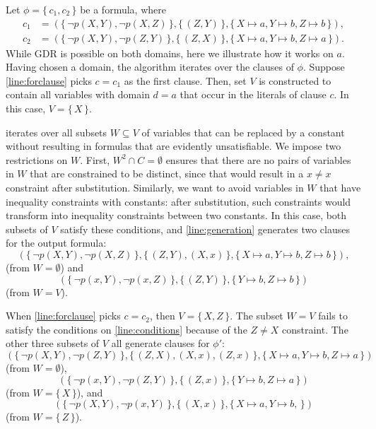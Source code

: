 \begin{example}
  Let $\phi = \{\, c_1, c_2 \,\}$ be a formula, where
  \begin{align*}
    c_1 &= (\{\, \neg p(X, Y), \neg p(X, Z) \,\}, \{\, (Z, Y) \,\}, \{\, X \mapsto a, Y \mapsto b, Z \mapsto b \,\}), \\
    c_2 &= (\{\, \neg p(X, Y), \neg p(Z, Y) \,\}, \{\, (Z, X) \,\}, \{\, X \mapsto a, Y \mapsto b, Z \mapsto a \,\}).
  \end{align*}
  While GDR is possible on both domains, here we illustrate how it works on $a$.
  Having chosen a domain, the algorithm iterates over the clauses of $\phi$.
  Suppose \cref{line:forclause} picks $c = c_1$ as the first clause. Then, set
  $V$ is constructed to contain all variables with domain $d = a$ that occur in
  the literals of clause $c$. In this case, $V = \{\, X \,\}$.

   iterates over all subsets $W \subseteq V$ of variables
  that can be replaced by a constant without resulting in formulas that are
  evidently unsatisfiable. We impose two restrictions on $W$. First,
  $W^2 \cap C = \emptyset$ ensures that there are no pairs of variables in $W$
  that are constrained to be distinct, since that would result in a $x \ne x$
  constraint after substitution. Similarly, we want to avoid variables in $W$
  that have inequality constraints with constants: after substitution, such
  constraints would transform into inequality constraints between two constants.
  In this case, both subsets of $V$ satisfy these conditions, and
  \cref{line:generation} generates two clauses for the output formula:
  \[
    (\{\, \neg p(X, Y), \neg p(X, Z) \,\}, \{\, (Z, Y), (X, x) \,\}, \{\, X \mapsto a, Y \mapsto b, Z \mapsto b \,\}),
  \]
  (from $W = \emptyset$) and
  \[
    (\{\, \neg p(x, Y), \neg p(x, Z) \,\}, \{\, (Z, Y) \,\}, \{\, Y \mapsto b, Z \mapsto b \,\})
  \]
  (from $W = V$).

  When \cref{line:forclause} picks $c = c_2$, then $V = \{\, X, Z \,\}$. The
  subset $W = V$ fails to satisfy the conditions on \cref{line:conditions}
  because of the $Z \ne X$ constraint. The other three subsets of $V$ all
  generate clauses for $\phi'$:
  \[
    (\{\, \neg p(X, Y), \neg p(Z, Y) \,\}, \{\, (Z, X), (X, x), (Z, x) \,\}, \{\, X \mapsto a, Y \mapsto b, Z \mapsto a \,\})
  \]
  (from $W = \emptyset$),
  \[
    (\{\, \neg p(x, Y), \neg p(Z, Y) \,\}, \{\, (Z, x) \,\}, \{\, Y \mapsto b, Z \mapsto a \,\})
  \]
  (from $W = \{\, X \,\}$), and
  \[
    (\{\, \neg p(X, Y), \neg p(x, Y) \,\}, \{\, (X, x) \,\}, \{\, X \mapsto a, Y \mapsto b, \,\})
  \]
  (from $W = \{\, Z \,\}$).
\end{example}

